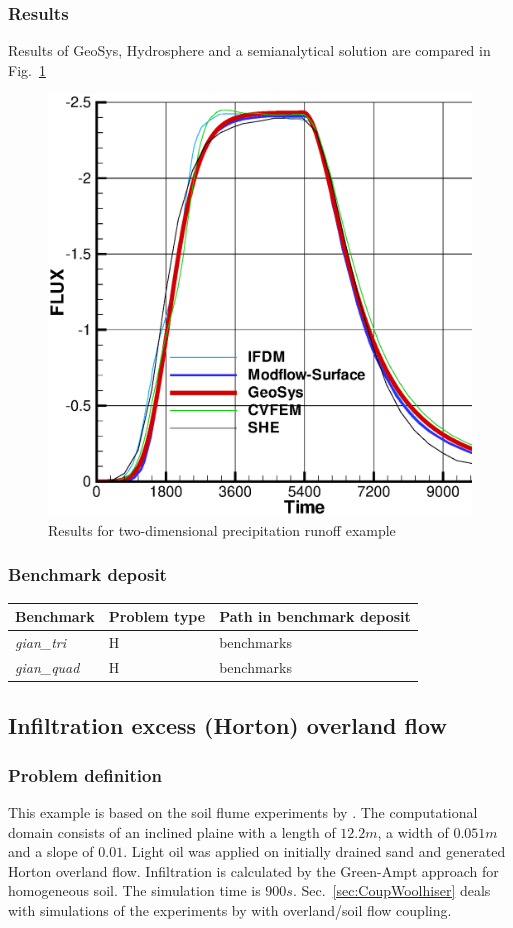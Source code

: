 \subsubsection*{Results}
%
Results of GeoSys, Hydrosphere and a semianalytical solution are compared in Fig.~\ref{OLF:giammarco}
%
\begin{figure} [htb!]
 \centering
 \includegraphics[width=0.75\columnwidth] {H_SFC/figures/gian.eps}
 \caption{Results for two-dimensional precipitation runoff example}
 \label{OLF:giammarco}
\end{figure}
%
\subsubsection*{Benchmark deposit}
%
\begin{tabular}{|l|l|l|}
  \hline
  Benchmark & Problem type & Path in benchmark deposit \\
  \hline
  \emph{gian\_tri} & H & benchmarks\verb \OVERLAND_FLOW\ \\
  \emph{gian\_quad} & H & benchmarks\verb \OVERLAND_FLOW\ \\
  \hline
\end{tabular}
%
%
\subsection{Infiltration excess (Horton) overland flow}
%
\subsubsection*{Problem definition}
%
This example is based on the soil flume experiments by \cite{Smith:71}.
The computational domain consists of an inclined plaine with a length of $12.2 m$, a width of $0.051 m$ and a slope of $0.01$.
Light oil was applied on initially drained sand and generated Horton overland flow. Infiltration is calculated by the Green-Ampt
approach for homogeneous soil. The simulation time is $900s$. Sec.~\ref{sec:CoupWoolhiser} deals with simulations of the experiments by \cite{Smith:71} with overland/soil flow coupling.
%
